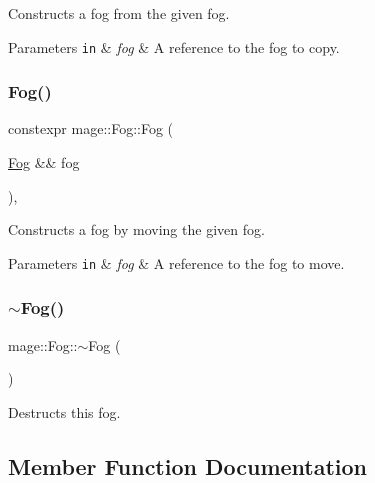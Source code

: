 Constructs a fog from the given fog.


\begin{DoxyParams}[1]{Parameters}
\mbox{\tt in}  & {\em fog} & A reference to the fog to copy. \\
\hline
\end{DoxyParams}
\hypertarget{classmage_1_1_fog_ac982e1149078f524158c79e36beb4190}{}\label{classmage_1_1_fog_ac982e1149078f524158c79e36beb4190} 
\subsubsection{\texorpdfstring{Fog()}{Fog()}\hspace{0.1cm}{\footnotesize\ttfamily [3/3]}}
{\footnotesize\ttfamily constexpr mage\+::\+Fog\+::\+Fog (\begin{DoxyParamCaption}\item[{\hyperlink{classmage_1_1_fog}{Fog} \&\&}]{fog }\end{DoxyParamCaption})\hspace{0.3cm}{\ttfamily [default]}, {\ttfamily [noexcept]}}

Constructs a fog by moving the given fog.


\begin{DoxyParams}[1]{Parameters}
\mbox{\tt in}  & {\em fog} & A reference to the fog to move. \\
\hline
\end{DoxyParams}
\hypertarget{classmage_1_1_fog_a46b6b92a6b8a1b219bae756c82843659}{}\label{classmage_1_1_fog_a46b6b92a6b8a1b219bae756c82843659} 
\subsubsection{\texorpdfstring{$\sim$\+Fog()}{~Fog()}}
{\footnotesize\ttfamily mage\+::\+Fog\+::$\sim$\+Fog (\begin{DoxyParamCaption}{ }\end{DoxyParamCaption})\hspace{0.3cm}{\ttfamily [default]}}

Destructs this fog. 

\subsection{Member Function Documentation}
\hypertarget{classmage_1_1_fog_ad6ad839cf0dea51c3871f978bc552364}{}\label{classmage_1_1_fog_ad6ad839cf0dea51c3871f978bc552364} 
